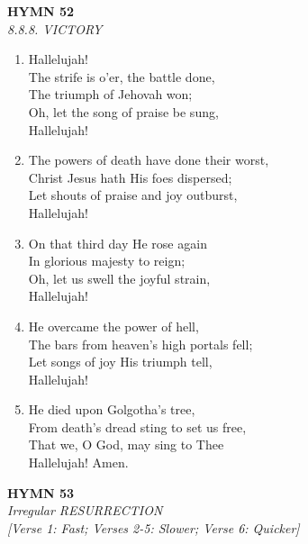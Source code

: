 \documentclass[11pt,a4paper]{article}
\begin{document}
\newpage
\begin{center}
    {\Large \textbf{HYMN 52}}
    \\
    \textit{8.8.8. VICTORY}
\end{center}
\vspace{1em}

\begin{enumerate}
    \item Hallelujah! \\
        The strife is o'er, the battle done, \\
        The triumph of Jehovah won; \\
        Oh, let the song of praise be sung, \\
        Hallelujah!

    \item The powers of death have done their worst, \\
        Christ Jesus hath His foes dispersed; \\
        Let shouts of praise and joy outburst, \\
        Hallelujah!

    \item On that third day He rose again \\
        In glorious majesty to reign; \\
        Oh, let us swell the joyful strain, \\
        Hallelujah!

    \item He overcame the power of hell, \\
        The bars from heaven's high portals fell; \\
        Let songs of joy His triumph tell, \\
        Hallelujah!

    \item He died upon Golgotha's tree, \\
        From death's dread sting to set us free, \\
        That we, O God, may sing to Thee \\
        Hallelujah! Amen.

\end{enumerate}

\newpage
\begin{center}
    {\Large \textbf{HYMN 53}}
    \\
    \textit{Irregular RESURRECTION}
    \\
    \textit{\small [Verse 1: Fast; Verses 2-5: Slower; Verse 6: Quicker]}
\end{center}
\vspace{1em}
\end{document}
